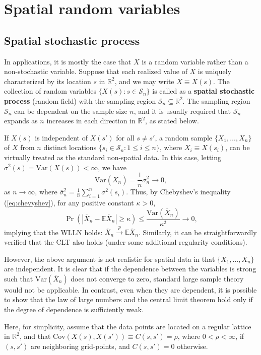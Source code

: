 \documentclass[10.5pt, A4paper, openany, uplatex]{book}
\newcommand{\mcl}{\mathcal}
\newcommand{\E}{\mathbb{E}}
\newcommand{\Var}{\mathrm{Var}}
\newcommand{\Cov}{\mathrm{Cov}}
\renewcommand{\bar}{\overline}
\numberwithin{equation}{section}
\begin{document}
\section{Spatial random variables}
\subsection{Spatial stochastic process}
In applications, it is mostly the case that $X$ is a random variable rather than a non-stochastic variable.
Suppose that each realized value of $X$ is uniquely characterized by its location $s$ in $\mathbb{R}^2$, and we may write $X \equiv X(s)$.
The collection of random variables $\{X(s) : s \in \mcl{S}_n\}$ is called as a \textbf{spatial stochastic process} (random field) with the sampling region $\mcl{S}_n \subseteq \mathbb{R}^2$.
The sampling region $\mcl{S}_n$ can be dependent on the sample size $n$, and it is usually required that $\mcl{S}_n$ expands as $n$ increases in each direction in $\mathbb{R}^2$, as stated below.

If $X(s)$ is independent of $X(s')$ for all $s \neq s'$, a random sample $\{X_1, \ldots, X_n\}$ of $X$ from $n$ distinct locations $\{s_i \in \mcl{S}_n: 1 \le i \le n\}$, where $X_i \equiv X(s_i)$, can be virtually treated as the standard non-spatial data.
In this case, letting $\sigma^2(s) = \Var(X(s)) < \infty$, we have
\[
	\Var\left( \bar X_n\right) = \frac{1}{n} \bar{\sigma}^2_n \to 0,
\]
as $n \to \infty$, where $\bar{\sigma}^2_n = \frac{1}{n}\sum_{i=1}^n \sigma^2(s_i)$.
Thus, by Chebyshev's inequality (\ref{eq:chevyshev}), for any positive constant $\kappa >0$,
\[
	\Pr\left( \left| \bar X_n - \E \bar X_n \right| \ge \kappa \right) \le \frac{\Var(\bar X_n)}{\kappa^2} \to 0,
\]
implying that the WLLN holds: $\bar X_n \overset{p}{\to} \E \bar X_n$. 
Similarly, it can be straightforwardly verified that the CLT also holds (under some additional regularity conditions).

However, the above argument is not realistic for spatial data in that $\{X_1, \ldots, X_n\}$ are independent.
It is clear that if the dependence between the variables is strong such that $\Var\left( \bar X_n\right)$ does not converge to zero, standard large sample theory would not be applicable.
In contrast, even when they are dependent, it is possible to show that the law of large numbers and the central limit theorem hold only if the degree of dependence is sufficiently weak.

Here, for simplicity, assume that the data points are located on a regular lattice in $\mathbb{R}^2$, and that $\Cov(X(s), X(s')) \equiv C(s, s') = \rho$, where $0 < \rho < \infty$, if $(s, s')$ are neighboring grid-points, and $C(s, s') = 0$ otherwise.
\end{document}
